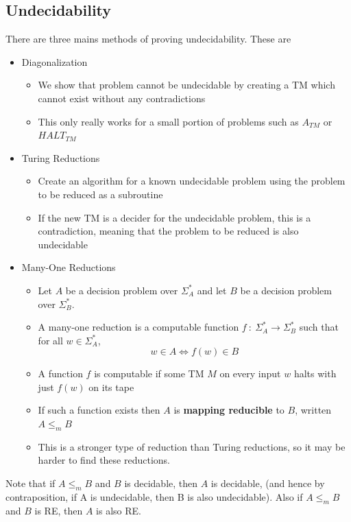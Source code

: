 \documentclass{article}
\begin{document}
    \subsection{Undecidability}
        There are three mains methods of proving undecidability. These are
        \begin{itemize}
            \item Diagonalization
            \begin{itemize}
                \item We show that problem cannot be undecidable by creating a TM which cannot exist without any contradictions
                \item This only really works for a small portion of problems such as $A_{TM}$ or $HALT_{TM}$
            \end{itemize}
            \item Turing Reductions
            \begin{itemize}
                \item Create an algorithm for a known undecidable problem using the problem to be reduced as a subroutine
                \item If the new TM is a decider for the undecidable problem, this is a contradiction, meaning that the problem to be reduced is also undecidable
            \end{itemize}
            \item Many-One Reductions
            \begin{itemize}
                \item Let $A$ be a decision problem over $\Sigma^*_A$ and let $B$ be a decision problem over $\Sigma^*_B$.
                \item A many-one reduction is a computable function $f \ : \ \Sigma^*_A \to \Sigma^*_B$ such that for all $w \in \Sigma^*_A$, 
                \[ w \in A \iff f(w) \in B \]
                \item A function $f$ is computable if some TM $M$ on every input $w$ halts with just $f(w)$ on its tape
                \item If such a function exists then $A$ is \textbf{mapping reducible} to $B$, written $A \leq_m B$
                \item This is a stronger type of reduction than Turing reductions, so it may be harder to find these reductions. 
            \end{itemize}
        \end{itemize}
        Note that if $A \leq_m B$ and $B$ is decidable, then $A$ is decidable, (and hence by contraposition, if A is undecidable, then B is also undecidable). Also if $A \leq_m B$ and $B$ is RE, then $A$ is also RE. 
\end{document}
